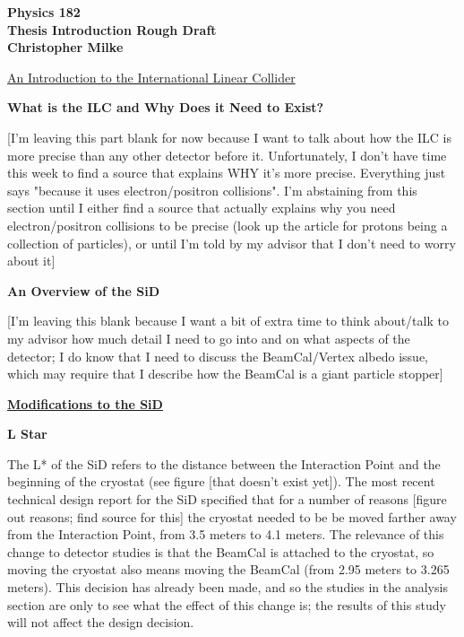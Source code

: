 \documentclass{article}
\begin{document}
    \begin{center}
        \bf{\large Physics 182 \\ Thesis Introduction Rough Draft \\ Christopher Milke}
    \end{center}


    \vspace{10mm}
    \begin{center}
        \underline{ \large An Introduction to the International Linear Collider }
    \end{center}
        \begin{center}
            \bf{What is the ILC and Why Does it Need to Exist?}
        \end{center}

        [I'm leaving this part blank for now because I want to talk about how the ILC is more precise than any other detector before it. Unfortunately, I don't have time this week to find a source that explains WHY it's more precise. Everything just says "because it uses electron/positron collisions". I'm abstaining from this section until I either find a source that actually explains why you need electron/positron collisions to be precise (look up the article for protons being a collection of particles), or until I'm told by my advisor that I don't need to worry about it]

        \vspace{5mm}
        \begin{center}
            \bf{An Overview of the SiD}
        \end{center}

        [I'm leaving this blank because I want a bit of extra time to think about/talk to my advisor how much detail I need to go into and on what aspects of the detector; I do know that I need to discuss the BeamCal/Vertex albedo issue, which may require that I describe how the BeamCal is a giant particle stopper]



    \vspace{10mm}
    \begin{center}
        \underline{\bf{\large Modifications to the SiD}}
    \end{center}
        \begin{center}
            \bf{L Star}
        \end{center}

        The L* of the SiD refers to the distance between the Interaction Point and the beginning of the cryostat (see figure [that doesn't exist yet]). The most recent technical design report for the SiD specified that for a number of reasons [figure out reasons; find source for this] the cryostat needed to be be moved farther away from the Interaction Point, from 3.5 meters to 4.1 meters. The relevance of this change to detector studies is that the BeamCal is attached to the cryostat, so moving the cryostat also means moving the BeamCal (from 2.95 meters to 3.265 meters). This decision has already been made, and so the studies in the analysis section are only to see what the effect of this change is; the results of this study will not affect the design decision.
\end{document}
